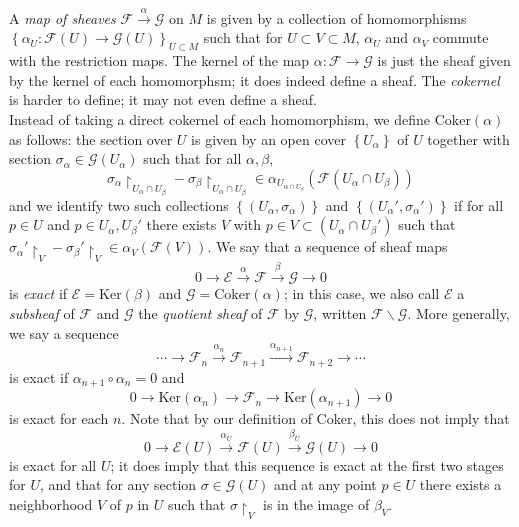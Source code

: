 \documentclass{article}
\begin{document}
A \textit{map of sheaves} $ \mathcal{F} \xrightarrow{\alpha} \mathcal{G}$ on $M$ is given by a collection of homomorphisms $ \left\{ \alpha_U: \mathcal{F}(U) \to \mathcal{G}(U) \right\}_{U \subset M}$ such that for $U \subset V \subset M$, $\alpha_U$ and $\alpha_V$ commute with the restriction maps. The kernel of the map $\alpha: \mathcal{F} \to \mathcal{G}$ is just the sheaf given by the kernel of each homomorphsm; it does indeed define a sheaf. The \textit{cokernel} is harder to define; it may not even define a sheaf.\\
Instead of taking a direct cokernel of each homomorphism, we define $ \mathrm{Coker}(\alpha)$ as follows: the section over $U$ is given by an open cover $ \left\{ U_{\alpha} \right\} $ of $U$ together with section $\sigma_{\alpha} \in \mathcal{G}(U_{\alpha})$ such that for all $\alpha, \beta$,
\[
	\sigma_{\alpha} \restriction_{U_{\alpha} \cap U_{\beta}} - \sigma_{\beta} \restriction_{U_{\alpha} \cap U_{\beta} } \in \alpha_{U_{\alpha \cap U_{\beta}}} \left( \mathcal{F}(U_{\alpha} \cap U_{\beta}) \right) 
\]
and we identify two such collections $ \left\{ (U_{\alpha}, \sigma_{\alpha} ) \right\} $ and $ \left\{ (U_{\alpha}', \sigma_{\alpha}') \right\} $ if for all $p \in U$ and $p \in U_{\alpha}, U_{\beta}'$ there exists $V$ with $p \in V \subset \left( U_{\alpha} \cap U_{\beta}' \right) $ such that $\sigma_{\alpha}' \restriction_V - \sigma_{\beta}' \restriction_V \in \alpha_V \left( \mathcal{F}(V) \right) $.
\indent We say that a sequence of sheaf maps
\[
	0 \to \mathcal{E} \xrightarrow{\alpha} \mathcal{F} \xrightarrow{\beta} \mathcal{G} \to 0
\]
is \textit{exact} if $ \mathcal{E} = \mathrm{Ker}(\beta)$ and $ \mathcal{G} = \mathrm{Coker}(\alpha)$; in this case, we also call $ \mathcal{E}$ a \textit{subsheaf} of $ \mathcal{F}$ and $ \mathcal{G}$ the \textit{quotient sheaf} of $ \mathcal{F}$ by $ \mathcal{G}$, written $ \mathcal{F} \backslash \mathcal{G}$. More generally, we say a sequence 
\[
	\cdots \to \mathcal{F}_n \xrightarrow{\alpha_n} \mathcal{F}_{n+1} \xrightarrow{\alpha_{n+1}} \mathcal{F}_{n+2} \to \cdots
\]
is exact if $ \alpha_{n+1} \circ \alpha_n = 0$ and 
\[
	0 \to \mathrm{Ker} \left( \alpha_n \right) \to \mathcal{F}_n \to \mathrm{Ker} \left( \alpha_{n+1} \right) \to 0
\]
is exact for each $n$. Note that by our definition of Coker, this does not imply that 
\[
	0 \to \mathcal{E}(U) \xrightarrow{\alpha_U} \mathcal{F}(U) \xrightarrow{\beta_U} \mathcal{G}(U) \to 0
\]
is exact for all $U$; it does imply that this sequence is exact at the first two stages for $U$, and that for any section $ \sigma \in \mathcal{G}(U)$ and at any point $p \in U$ there exists a neighborhood $V$ of $p$ in $U$ such that $\sigma \restriction_V$ is in the image of $\beta_V$. \\
\end{document}
